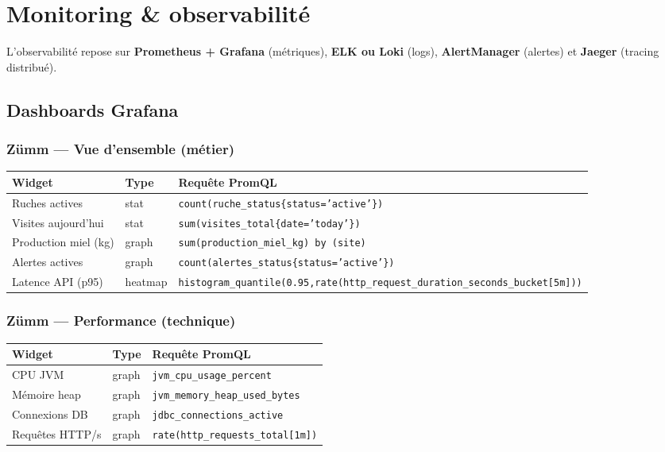 \chapter{Monitoring \& observabilité}
\label{chap:monitoring}

L'observabilité repose sur \textbf{Prometheus + Grafana} (métriques),
\textbf{ELK ou Loki} (logs), \textbf{AlertManager} (alertes) et
\textbf{Jaeger} (tracing distribué).

\section{Dashboards Grafana}

\subsection{Zümm --- Vue d'ensemble (métier)}

\begin{center}
\small
\begin{tabular}{llp{7.6cm}}
\toprule
\textbf{Widget} & \textbf{Type} & \textbf{Requête PromQL} \\
\midrule
Ruches actives        & stat    & \texttt{count(ruche\_status\{status='active'\})} \\
Visites aujourd'hui   & stat    & \texttt{sum(visites\_total\{date='today'\})} \\
Production miel (kg)  & graph   & \texttt{sum(production\_miel\_kg) by (site)} \\
Alertes actives       & graph   & \texttt{count(alertes\_status\{status='active'\})} \\
Latence API (p95)     & heatmap & {\scriptsize\texttt{histogram\_quantile(0.95,}\newline\texttt{rate(http\_request\_duration\_seconds\_bucket[5m]))}} \\
\bottomrule
\end{tabular}
\end{center}

\subsection{Zümm --- Performance (technique)}

\begin{center}
\small
\begin{tabular}{llp{7.6cm}}
\toprule
\textbf{Widget} & \textbf{Type} & \textbf{Requête PromQL} \\
\midrule
CPU JVM          & graph & \texttt{jvm\_cpu\_usage\_percent} \\
Mémoire heap     & graph & \texttt{jvm\_memory\_heap\_used\_bytes} \\
Connexions DB    & graph & \texttt{jdbc\_connections\_active} \\
Requêtes HTTP/s  & graph & \texttt{rate(http\_requests\_total[1m])} \\
\bottomrule
\end{tabular}
\end{center}


